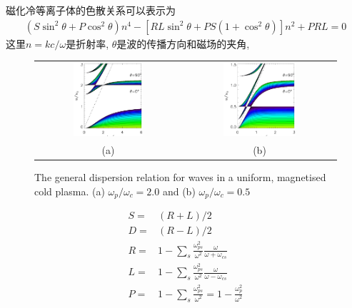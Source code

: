 \documentclass{article}
\begin{document}
	磁化冷等离子体的色散关系可以表示为\citep{Diver2001}
	\begin{align}
		\left(S \sin^2 \theta + P \cos^2 \theta\right) n^4 - \left[R L \sin^2 \theta
		+ P S \left(1 + \cos^2 \theta\right) \right] n^2 + P R L= 0 \label{Eqn:Colp}
	\end{align}
	这里$n = k c / \omega$是折射率, $\theta$是波的传播方向和磁场的夹角,
	\begin{figure}[htb]
		\begin{tabular}{cc}
			\includegraphics[width=0.5\textwidth]{figure2_1.eps} &
			\includegraphics[width=0.5\textwidth]{figure2_2.eps}
			\\
			(a) & (b)
		\end{tabular}
		\caption{The general dispersion relation for waves in a uniform, magnetised cold
			plasma. (a) $\omega_p / \omega_c = 2.0$ and (b) $\omega_p / \omega_c = 0.5$} \label{ColdPlasma}
	\end{figure}
	\begin{align*}
		S =& (R + L) / 2
		\\
		D =& (R - L) / 2
		\\
		R =& 1 - \sum_s \frac{\omega_{ps}^2}{\omega^2} \frac{\omega}{\omega + \omega_{cs}}
		\\
		L =& 1 - \sum_s \frac{\omega_{ps}^2}{\omega^2} \frac{\omega}{\omega - \omega_{cs}}
		\\
		P =& 1 - \sum_s \frac{\omega_{ps}^2}{\omega^2}  = 1 - \frac{\omega_p^2}{\omega^2}
	\end{align*}
\end{document}
